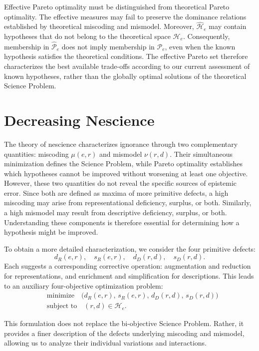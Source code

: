 Effective Pareto optimality must be distinguished from theoretical Pareto optimality. The effective measures may fail to preserve the dominance relations established by theoretical miscoding and mismodel. Moreover,
$\widehat{\mathcal H}_e$ may contain hypotheses that do not belong to the theoretical space $\mathcal H_e$. Consequently, membership in $\widehat{\mathcal P}_e$ does not imply membership in $\mathcal P_e$, even when
the known hypothesis satisfies the theoretical conditions. The effective Pareto set therefore characterizes the best available trade-offs according to our current assessment of known hypotheses, rather than the globally optimal solutions of the theoretical Science Problem.

%
%

\section{Decreasing Nescience}
\label{sec:decreasing_nescience}

The theory of nescience characterizes ignorance through two complementary quantities: miscoding $\mu(e,r)$ and mismodel $\nu(r,d)$. Their simultaneous minimization defines the Science Problem, while Pareto optimality establishes which hypotheses cannot be improved without worsening at least one objective. However, these two quantities do not reveal the specific sources of epistemic error. Since both are defined as maxima of more primitive defects, a high miscoding may arise from representational deficiency, surplus, or both. Similarly, a high mismodel may result from descriptive deficiency, surplus, or both. Understanding these components is therefore essential for determining how a hypothesis might be improved.

To obtain a more detailed characterization, we consider the four primitive defects:
\[
d_R(e,r),\quad s_R(e,r),\quad d_D(r,d),\quad s_D(r,d).
\]
Each suggests a corresponding corrective operation: augmentation and reduction for representations, and enrichment and simplification for descriptions. This leads to an auxiliary four-objective optimization problem:
\begin{align*}
& \text{minimize}\quad \bigl(d_R(e,r),\, s_R(e,r),\, d_D(r,d),\, s_D(r,d) \bigr)\\
& \text{subject to}\quad (r,d)\in\mathcal H_e.
\end{align*}

This formulation does not replace the bi-objective Science Problem. Rather, it provides a finer description of the defects underlying miscoding and mismodel, allowing us to analyze their individual variations and interactions.

